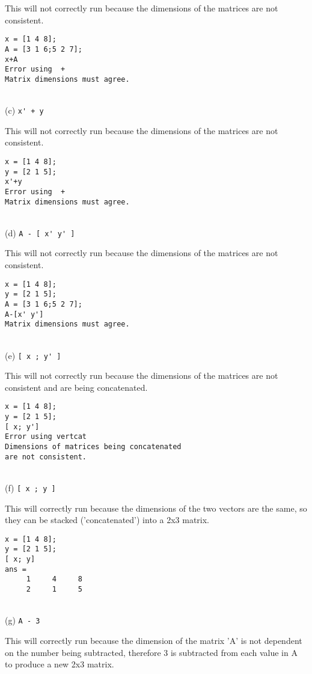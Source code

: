 \documentclass [12pt] {article}
\begin{document}
\par This will not correctly run because the dimensions of the matrices are not
consistent.
\indent \begin{Verbatim}[xleftmargin=.5in]
x = [1 4 8];
A = [3 1 6;5 2 7];
x+A
Error using  + 
Matrix dimensions must agree.
\end{Verbatim}
\\\indent(c) \verb|x' + y| \\
\par This will not correctly run because the dimensions of the matrices are not
consistent.
\indent \begin{Verbatim}[xleftmargin=.5in]
x = [1 4 8];
y = [2 1 5];
x'+y
Error using  + 
Matrix dimensions must agree.
\end{Verbatim}
\\\indent(d) \verb|A - [ x' y' ]| \\
\par This will not correctly run because the dimensions of the matrices are not
consistent.
\indent \begin{Verbatim}[xleftmargin=.5in]
x = [1 4 8];
y = [2 1 5];
A = [3 1 6;5 2 7];
A-[x' y']
Matrix dimensions must agree.
\end{Verbatim}
\\\indent(e) \verb|[ x ; y' ]| \\
\par This will not correctly run because the dimensions of the matrices are not
consistent and are being concatenated.
\indent \begin{Verbatim}[xleftmargin=.5in]
x = [1 4 8];
y = [2 1 5];
[ x; y']
Error using vertcat
Dimensions of matrices being concatenated
are not consistent.
\end{Verbatim}
\\\indent(f) \verb|[ x ; y ]| \\
\par This will correctly run because the dimensions of the two vectors are the
 same, so they can be stacked ('concatenated') into a 2x3 matrix.
\indent \begin{Verbatim}[xleftmargin=.5in]
x = [1 4 8];
y = [2 1 5];
[ x; y]
ans =
     1     4     8
     2     1     5
\end{Verbatim}
\\\indent(g) \verb|A - 3|  \\
\par This will correctly run because the dimension of the matrix 'A' is not dependent on the number being subtracted, therefore 3 is subtracted from each value in A to produce a new 2x3 matrix.
\end{document}
